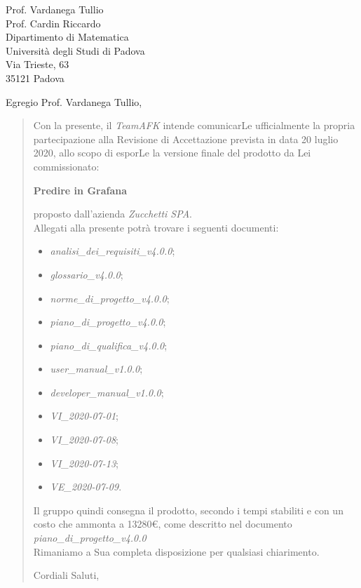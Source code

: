 \begin{letter}{
		Prof. Vardanega Tullio \\
		Prof. Cardin Riccardo \\
		Dipartimento di Matematica \\
		Università degli Studi di Padova \\
		Via Trieste, 63 \\
		35121 Padova}
		
\opening{Egregio Prof. Vardanega Tullio,}

\begin{quotation}
Con la presente, il \textit{TeamAFK} intende comunicarLe ufficialmente la propria partecipazione alla Revisione di Accettazione prevista in data 20 luglio 2020, allo scopo di esporLe la versione finale del prodotto da Lei commissionato:

\begin{center}
	\textbf{Predire in Grafana}
\end{center}

\noindent proposto dall'azienda \textit{Zucchetti SPA}.\\
Allegati alla presente potrà trovare i seguenti documenti:
\begin{itemize}
	\item \textit{analisi\_dei\_requisiti\_v4.0.0};
	
	\item \textit{glossario\_v4.0.0};
	
	\item \textit{norme\_di\_progetto\_v4.0.0};

	\item \textit{piano\_di\_progetto\_v4.0.0};

	\item \textit{piano\_di\_qualifica\_v4.0.0};
	
	\item \textit{user\_manual\_v1.0.0};
	\item \textit{developer\_manual\_v1.0.0};
	
	\item \textit{VI\_2020-07-01};
	\item \textit{VI\_2020-07-08};
	\item \textit{VI\_2020-07-13};
	\item \textit{VE\_2020-07-09}.
\end{itemize}
\pagebreak
\noindent 
Il gruppo quindi consegna il prodotto, secondo i tempi stabiliti e con un costo che ammonta a 13280€, come descritto nel documento \textit{piano\_di\_progetto\_v4.0.0}\\
Rimaniamo a Sua completa disposizione per qualsiasi chiarimento.

\vspace{0.5cm}
\closing{ Cordiali Saluti,}
	

\end{quotation}
		
\end{letter}